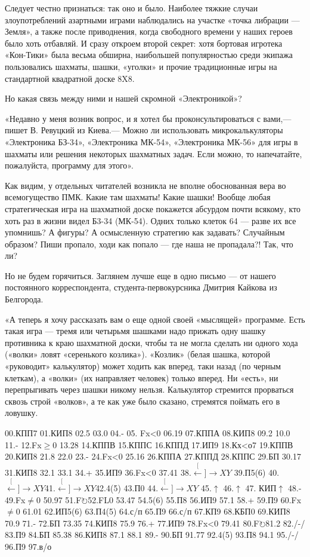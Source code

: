 \documentclass[11pt,a4paper,oneside]{article}
\def\XY{$\stackrel[\leftarrow]{\rightarrow}{XY}$}
\def\FO{F$\circlearrowright$}
\begin{document}
Следует честно признаться: так оно и было. Наиболее тяжкие случаи злоупотреблений азартными играми наблюдались на участке «точка либрации — Земля», а также после приводнения, когда свободного времени у наших героев было хоть отбавляй. И сразу откроем второй секрет: хотя бортовая игротека «Кон-Тики» была весьма обширна, наибольшей популярностью среди экипажа пользовались шахматы, шашки, «уголки» и прочие традиционные игры на стандартной квадратной доске 8X8.

Но какая связь между ними и нашей скромной «Электроникой»?

«Недавно у меня возник вопрос, и я хотел бы проконсультироваться с вами,— пишет В. Ревуцкий из Киева.— Можно ли использовать микрокалькуляторы «Электроника БЗ-34», «Электроника МК-54», «Электроника МК-56» для игры в шахматы или решения некоторых шахматных задач. Если можно, то напечатайте, пожалуйста, программу для этого».

Как видим, у отдельных читателей возникла не вполне обоснованная вера во всемогущество ПМК. Какие там шахматы! Какие шашки! Вообще любая стратегическая игра на шахматной доске покажется абсурдом почти всякому, кто хоть раз в жизни видел Б3-34 (МК-54). Одних только клеток 64 — разве их все упомнишь? А фигуры? А осмысленную стратегию как задавать? Случайным образом? Пиши пропало, ходи как попало — где наша не пропадала?! Так, что ли?

Но не будем горячиться. Заглянем лучше еще в одно письмо — от нашего постоянного корреспондента, студента-первокурсника Дмитрия Кайкова из Белгорода.

«А теперь я хочу рассказать вам о еще одной своей «мыслящей» программе. Есть такая игра — тремя или четырьмя шашками надо прижать одну шашку противника к краю шахматной доски, чтобы та не могла сделать ни одного хода («волки» ловят «серенького козлика»). «Козлик» (белая шашка, которой «руководит» калькулятор) может ходить как вперед, таки назад (по черным клеткам), а «волки» (их направляет человек) только вперед. Ни «есть», ни перепрыгивать через шашки никому нельзя. Калькулятор стремится прорваться сквозь строй «волков», а те как уже было сказано, стремятся поймать его в ловушку.

00.КПП7 01.КИП8 02.5 03.0 04.- 05. Fx<0 06.19 07.КППА 08.КИП8 09.2 10.0 11.- 12.Fx$\geq$0 13.28 14.КППВ 15.КППС 16.КППД 17.ИП9 18.Кх<о7 19.КППВ 20.КИП8 21.8 22.0 23.- 24.Fx<0 25.16 26.КППА 27.КППД 28.КППС 29.БП 30.17 31.КИП8
32.1 33.1 34.+ 35.ИП9 36.Fx<0 37.41 38.\XY
39.П5(6) 40.\XY 41.\XY 42.4(5) 43.П0 44.\XY
45.$\uparrow$ 46.$\uparrow$ 47. КИП$\uparrow$ 48.- 49.Fx$\neq$0 50.97 51.\FO 52.FL0 53.47 54.5(6) 55.П8 56.ИП9 57.1 58.+ 59.П9 60.Fx$\neq$0 61.01 62.ИП5(6) 63.П4(5)
64.с/п 65.П9 66.с/п 67.КП9 68.КБП0 69.КИП8 70.9 71.- 72.БП 73.35 74.КИП8 75.9 76.+ 77.ИП9 78.Fx<0 79.41 80.\FO 81.2 82./-/ 83.П9 84.БП 85.38 86.КИП8 87.1 88.1 89.- 90.БП 91.77 92.4(5) 93.П8 94.1 95./-/ 96.П9 97.в/о
\end{document}
